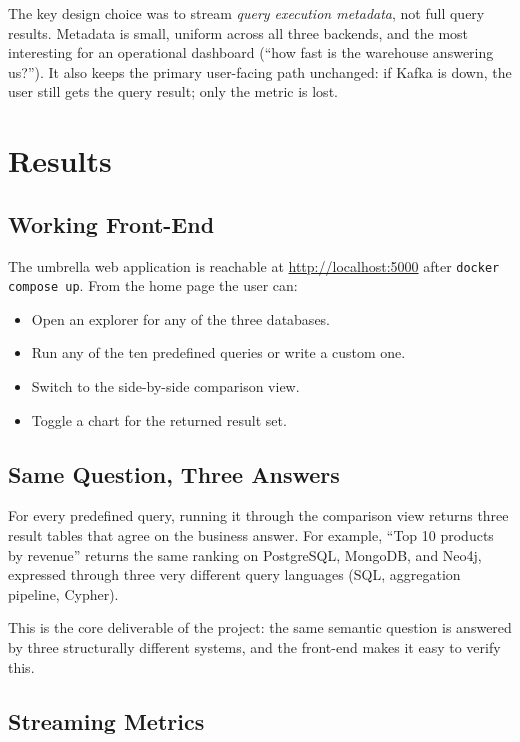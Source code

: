 \documentclass[11pt,a4paper]{article}
\begin{document}
The key design choice was to stream \emph{query execution metadata}, not
full query results. Metadata is small, uniform across all three backends,
and the most interesting for an operational dashboard (``how fast is the
warehouse answering us?''). It also keeps the primary user-facing path
unchanged: if Kafka is down, the user still gets the query result; only the
metric is lost.

\section{Results}\label{sec:results}

\subsection{Working Front-End}

The umbrella web application is reachable at \url{http://localhost:5000}
after \texttt{docker compose up}. From the home page the user can:

\begin{itemize}[leftmargin=*]
    \item Open an explorer for any of the three databases.
    \item Run any of the ten predefined queries or write a custom one.
    \item Switch to the side-by-side comparison view.
    \item Toggle a chart for the returned result set.
\end{itemize}

\subsection{Same Question, Three Answers}

For every predefined query, running it through the comparison view returns
three result tables that agree on the business answer. For example, ``Top 10
products by revenue'' returns the same ranking on PostgreSQL, MongoDB, and
Neo4j, expressed through three very different query languages
(SQL, aggregation pipeline, Cypher).

This is the core deliverable of the project: the same semantic question is
answered by three structurally different systems, and the front-end makes it
easy to verify this.

\subsection{Streaming Metrics}
\end{document}
